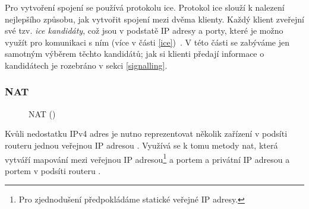 Pro vytvoření spojení se používá protokolu \gls{ice}. Protokol \gls{ice} slouží
k nalezení nejlepšího způsobu, jak vytvořit spojení mezi dvěma klienty. Každý
klient zveřejní své tzv. \textit{\gls{ice} kandidáty}, což jsou v podstatě IP
adresy a porty, které je možno využít pro komunikaci s ním (více v části
\ref{ice})~\parencite{WebRTCForTheCurious}. V této části se zabýváme jen
samotným výběrem těchto kandidátů; jak si klienti předají informace o
kandidátech je rozebráno v sekci \ref{signalling}.

\subsubsection{NAT}\label{nat}

\begin{figure}[H]
    \centering
    \caption{NAT (\publicPrivateIP)}
    \label{natFig}
\end{figure}

Kvůli nedostatku IPv4 adres je nutno reprezentovat několik zařízení v podsíti
routeru jednou veřejnou IP adresou \parencite{Medium-NATWHyWeNeedIt}. Využívá se
k tomu metody \gls{nat}, která vytváří mapování mezi veřejnou IP
adresou\footnote{Pro zjednodušení předpokládáme statické veřejné IP adresy.} a
portem a privátní IP adresou a portem v podsíti routeru
\parencite{WebRTCForTheCurious}.

